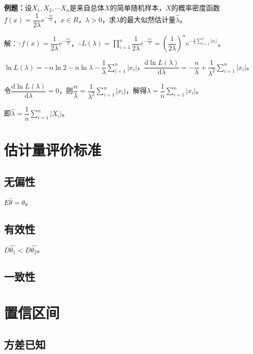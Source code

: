 \documentclass[UTF8, 12pt]{ctexart}
\begin{document}
\textbf{例题：}设$X_1,X_2,\cdots X_n$是来自总体$X$的简单随机样本，$X$的概率密度函数$f(x)=\dfrac{1}{2\lambda}e^{-\frac{\vert x\vert}{\lambda}}$，$x\in R$，$\lambda>0$，求$\lambda$的最大似然估计量$\hat{\lambda}$。

解：$\because f(x)=\dfrac{1}{2\lambda}e^{-\frac{\vert x\vert}{\lambda}}$，$\therefore L(\lambda)=\prod\limits_{i=1}^n\dfrac{1}{2\lambda}e^{-\frac{\vert x\vert}{\lambda}}=\left(\dfrac{1}{2\lambda}\right)^ne^{-\frac{1}{\lambda}\sum\limits_{i=1}^n\vert x_i\vert}$。

$\ln L(\lambda)=-n\ln2-n\ln\lambda-\dfrac{1}{\lambda}\sum\limits_{i=1}^n\vert x_i\vert$，$\dfrac{\textrm{d}\ln L(\lambda)}{\textrm{d}\lambda}=-\dfrac{n}{\lambda}+\dfrac{1}{\lambda^2}\sum\limits_{i=1}^n\vert x_i\vert$。

令$\dfrac{\textrm{d}\ln L(\lambda)}{\textrm{d}\lambda}=0$，则$\dfrac{n}{\lambda}=\dfrac{1}{\lambda^2}\sum\limits_{i=1}^n\vert x_i\vert$，解得$\lambda=\dfrac{1}{n}\sum\limits_{i=1}^n\vert x_i\vert$。

即$\hat{\lambda}=\dfrac{1}{n}\sum\limits_{i=1}^n\vert X_i\vert$。

\section{估计量评价标准}

\subsection{无偏性}

$E\hat{\theta}=\theta$。

\subsection{有效性}

$D\hat{\theta_1}<D\hat{\theta_2}$。

\subsection{一致性}

\section{置信区间}

\subsection{方差已知}
\end{document}
